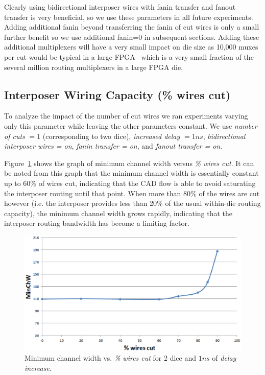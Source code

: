 \documentclass{sig-alternate-2013}
\begin{document}
Clearly using bidirectional interposer wires with fanin transfer and fanout transfer is very beneficial, so we use these parameters in all future experiments. Adding additional fanin beyond transferring the fanin of cut wires is only a small further benefit so we use additional fanin=0 in subsequent sections. Adding these additional multiplexers will have a very small impact on die size as 10,000 muxes per cut would be typical in a large FPGA~\cite{xilinx7series} which is a very small fraction of the several million routing multiplexers in a large FPGA die.


\subsection{Interposer Wiring Capacity (\% wires cut)}

To analyze the impact of the number of cut wires we ran experiments varying only this parameter while leaving the other parameters constant. We use \textit{number of cuts} $= 1$ (corresponding to two dice), \textit{increased delay} $= 1ns$, \textit{bidirectional interposer wires = on}, \textit{fanin transfer = on}, and \textit{fanout transfer = on}.

Figure~\ref{fig:standard_minW} shows the graph of minimum channel width versus \textit{\% wires cut}. It can be noted from this graph that the minimum channel width is essentially constant up to 60\% of wires cut, indicating that the CAD flow is able to avoid saturating the interposer routing until that point. When more than 80\% of the wires are cut however (i.e. the interposer provides less than 20\% of the usual within-die routing capacity), the minimum channel width grows rapidly, indicating that the interposer routing bandwidth has become a limiting factor.

\begin{figure}[!htbp]
\centering
\includegraphics[width=\linewidth]{minChW.eps}
\caption{Minimum channel width vs. \textit{\% wires cut} for 2 dice and $1ns$ of \textit{delay increase}.}
\label{fig:standard_minW}
\end{figure}
\end{document}
